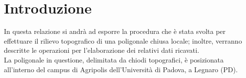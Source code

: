 \section{Introduzione}
In questa relazione si andrà ad esporre la procedura che è stata svolta per effettuare il rilievo topografico di una poligonale chiusa locale; inoltre, verranno descritte le operazioni per l'elaborazione dei relativi dati ricavati.\\
La poligonale in questione, delimitata da chiodi topografici, è posizionata all'interno del campus di Agripolis dell'Università di Padova, a Legnaro (PD).


 